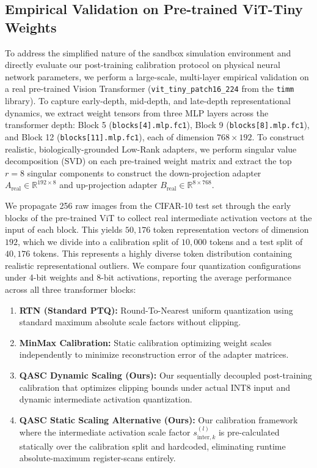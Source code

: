 \subsection{Empirical Validation on Pre-trained ViT-Tiny Weights}
\label{sec:empirical_quant_validation}
To address the simplified nature of the sandbox simulation environment and directly evaluate our post-training calibration protocol on physical neural network parameters, we perform a large-scale, multi-layer empirical validation on a real pre-trained Vision Transformer (\texttt{vit\_tiny\_patch16\_224} from the \texttt{timm} library). To capture early-depth, mid-depth, and late-depth representational dynamics, we extract weight tensors from three MLP layers across the transformer depth: Block 5 (\texttt{blocks[4].mlp.fc1}), Block 9 (\texttt{blocks[8].mlp.fc1}), and Block 12 (\texttt{blocks[11].mlp.fc1}), each of dimension $768 \times 192$. To construct realistic, biologically-grounded Low-Rank adapters, we perform singular value decomposition (SVD) on each pre-trained weight matrix and extract the top $r=8$ singular components to construct the down-projection adapter $A_{\text{real}} \in \mathbb{R}^{192 \times 8}$ and up-projection adapter $B_{\text{real}} \in \mathbb{R}^{8 \times 768}$.

We propagate 256 raw images from the CIFAR-10 test set through the early blocks of the pre-trained ViT to collect real intermediate activation vectors at the input of each block. This yields $50,176$ token representation vectors of dimension $192$, which we divide into a calibration split of $10,000$ tokens and a test split of $40,176$ tokens. This represents a highly diverse token distribution containing realistic representational outliers. We compare four quantization configurations under 4-bit weights and 8-bit activations, reporting the average performance across all three transformer blocks:
\begin{enumerate}
  \item \textbf{RTN (Standard PTQ):} Round-To-Nearest uniform quantization using standard maximum absolute scale factors without clipping.
  \item \textbf{MinMax Calibration:} Static calibration optimizing weight scales independently to minimize reconstruction error of the adapter matrices.
  \item \textbf{QASC Dynamic Scaling (Ours):} Our sequentially decoupled post-training calibration that optimizes clipping bounds under actual INT8 input and dynamic intermediate activation quantization.
  \item \textbf{QASC Static Scaling Alternative (Ours):} Our calibration framework where the intermediate activation scale factor $s_{\text{inter}, k}^{(l)}$ is pre-calculated statically over the calibration split and hardcoded, eliminating runtime absolute-maximum register-scans entirely.
\end{enumerate}

